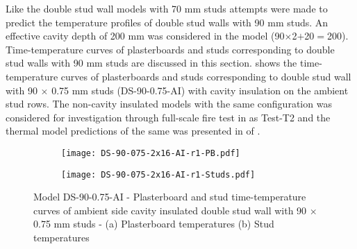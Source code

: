 Like the double stud wall models with 70 mm studs attempts were made to predict the temperature profiles of double stud walls with 90 mm studs. An effective cavity depth of 200 mm was considered in the model (90$\times$2$+$20$=$200). Time-temperature curves of plasterboards and studs corresponding to double stud walls with 90 mm studs are discussed in this section.  shows the time-temperature curves of plasterboards and studs corresponding to double stud wall with 90 $\times$ 0.75 mm studs (DS-90-0.75-AI) with cavity insulation on the ambient stud rows. The non-cavity insulated models with the same configuration was considered for investigation through full-scale fire test in  as Test-T2 and the thermal model predictions of the same was presented in  of .
\begin{figure}[!htbp]
	\centering
	\begin{subfigure}[b]{0.6\textwidth}
		\centering
		\texttt{[image: DS-90-075-2x16-AI-r1-PB.pdf]}
		\caption{}
		\label{subfig:DS-90-075-2x16-AI-r1-PB}
	\end{subfigure}
	\begin{subfigure}[b]{0.6\textwidth}
		\centering
		\texttt{[image: DS-90-075-2x16-AI-r1-Studs.pdf]}
		\caption{}
		\label{subfig:DS-90-075-2x16-AI-r1-Studs}
	\end{subfigure}
	   \caption{Model DS-90-0.75-AI - Plasterboard and stud time-temperature curves of ambient side cavity insulated double stud wall with 90 $\times$ 0.75 mm studs - (a) Plasterboard temperatures (b) Stud temperatures}
	   \label{fig:DS-90-075-2x16-AI-r1}
\end{figure}

